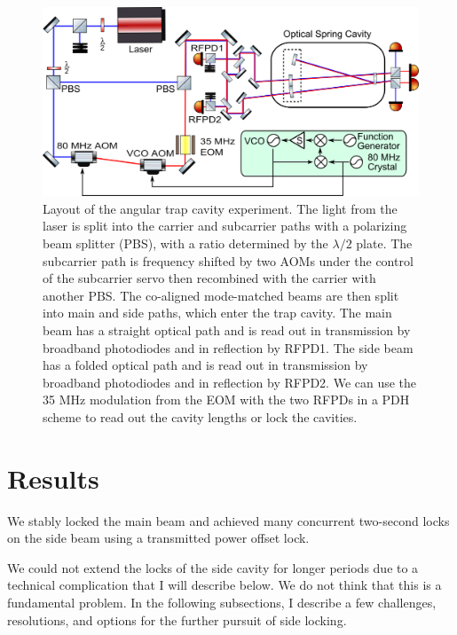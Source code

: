 \begin{figure}[p]
\begin{center}
\includegraphics[width=.9\textwidth]{figures/Angular/simplifiedLayout}
\end{center}
\caption[Angular trap experiment layout]{%
\label{f:experimentLayout}
Layout of the angular trap cavity experiment.
The light from the laser is split into the carrier and subcarrier paths with a polarizing beam splitter (PBS), with a ratio determined by the $\lambda/2$ plate.
The subcarrier path is frequency shifted by two AOMs under the control of the subcarrier servo then recombined with the carrier with another PBS. 
The co-aligned mode-matched beams are then split into main and side paths, which enter the trap cavity.
The main beam has a straight optical path and is read out in transmission by broadband photodiodes and in reflection by RFPD1.
The side beam has a folded optical path and is read out in transmission by broadband photodiodes and in reflection by RFPD2.
We can use the 35 MHz modulation from the EOM with the two RFPDs in a PDH scheme to read out the cavity
lengths or lock the cavities.
}
\end{figure}

\section{Results}

We stably locked the main beam and achieved many concurrent two-second locks on the side beam using a transmitted power offset lock.

We could not extend the locks of the side cavity for longer periods due to a technical complication that I will describe below. We do not think that this is a fundamental problem. 
In the following subsections, I describe a few challenges, resolutions, and options for the further pursuit of side locking.

